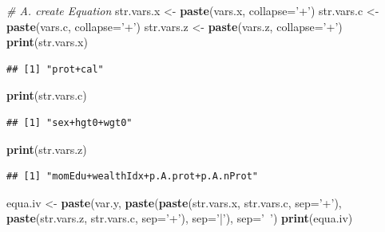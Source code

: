 \documentclass[
]{book}
\newenvironment{Shaded}{\begin{snugshade}}{\end{snugshade}}
\newcommand{\CommentTok}[1]{\textcolor[rgb]{0.56,0.35,0.01}{\textit{#1}}}
\newcommand{\DataTypeTok}[1]{\textcolor[rgb]{0.13,0.29,0.53}{#1}}
\newcommand{\KeywordTok}[1]{\textcolor[rgb]{0.13,0.29,0.53}{\textbf{#1}}}
\newcommand{\NormalTok}[1]{#1}
\newcommand{\StringTok}[1]{\textcolor[rgb]{0.31,0.60,0.02}{#1}}
\begin{document}
\begin{Shaded}
\begin{Highlighting}[]
\CommentTok{# A. create Equation}
\NormalTok{str.vars.x <-}\StringTok{ }\KeywordTok{paste}\NormalTok{(vars.x, }\DataTypeTok{collapse=}\StringTok{'+'}\NormalTok{)}
\NormalTok{str.vars.c <-}\StringTok{ }\KeywordTok{paste}\NormalTok{(vars.c, }\DataTypeTok{collapse=}\StringTok{'+'}\NormalTok{)}
\NormalTok{str.vars.z <-}\StringTok{ }\KeywordTok{paste}\NormalTok{(vars.z, }\DataTypeTok{collapse=}\StringTok{'+'}\NormalTok{)}
\KeywordTok{print}\NormalTok{(str.vars.x)}
\end{Highlighting}
\end{Shaded}

\begin{verbatim}
## [1] "prot+cal"
\end{verbatim}

\begin{Shaded}
\begin{Highlighting}[]
\KeywordTok{print}\NormalTok{(str.vars.c)}
\end{Highlighting}
\end{Shaded}

\begin{verbatim}
## [1] "sex+hgt0+wgt0"
\end{verbatim}

\begin{Shaded}
\begin{Highlighting}[]
\KeywordTok{print}\NormalTok{(str.vars.z)}
\end{Highlighting}
\end{Shaded}

\begin{verbatim}
## [1] "momEdu+wealthIdx+p.A.prot+p.A.nProt"
\end{verbatim}

\begin{Shaded}
\begin{Highlighting}[]
\NormalTok{equa.iv <-}\StringTok{ }\KeywordTok{paste}\NormalTok{(var.y,}
                 \KeywordTok{paste}\NormalTok{(}\KeywordTok{paste}\NormalTok{(str.vars.x, str.vars.c, }\DataTypeTok{sep=}\StringTok{'+'}\NormalTok{),}
                       \KeywordTok{paste}\NormalTok{(str.vars.z, str.vars.c, }\DataTypeTok{sep=}\StringTok{'+'}\NormalTok{),}
                       \DataTypeTok{sep=}\StringTok{'|'}\NormalTok{),}
                 \DataTypeTok{sep=}\StringTok{'~'}\NormalTok{)}
\KeywordTok{print}\NormalTok{(equa.iv)}
\end{Highlighting}
\end{Shaded}
\end{document}
